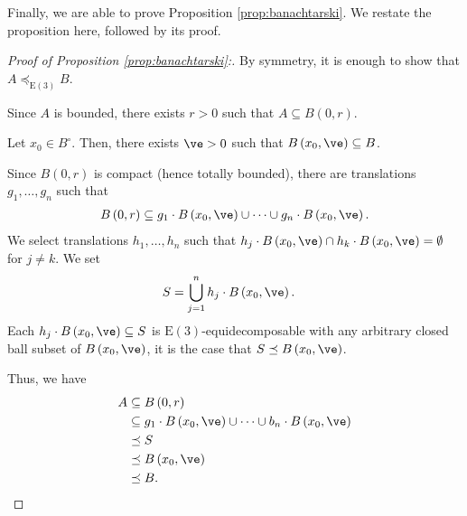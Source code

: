Finally, we are able to prove Proposition \ref{prop:banachtarski}. We restate the proposition here, followed by its proof.
\begin{tcolorbox}[blanker,breakable,left=3mm,before skip=10pt, after skip=10pt, borderline west={1pt}{0pt}{blue!50!white},sharp corners,]
\banachtarski*
\end{tcolorbox}
\begin{proof}[Proof of Proposition \ref{prop:banachtarski}:]
  By symmetry, it is enough to show that $A\preceq_{\text{E}(3)} B$.\newline

  Since $A$ is bounded, there exists $r > 0$ such that $A\subseteq B(0,r)$.\newline

  Let $x_0\in B^{\circ}$. Then, there exists $\ve > 0$ such that $B\left(x_0,\ve\right) \subseteq B$.\newline

  Since $B(0,r)$ is compact (hence totally bounded), there are translations $g_1,\dots,g_n$ such that
  \begin{align*}
    B\left(0,r\right) \subseteq g_1\cdot B\left(x_0,\ve\right) \cup \cdots \cup g_n\cdot B\left(x_0,\ve\right).
  \end{align*}
  We select translations $h_1,\dots,h_n$ such that $h_j\cdot B\left(x_0,\ve\right) \cap h_k\cdot B\left(x_0,\ve\right) = \emptyset$ for $j\neq k$. We set
  \begin{align*}
    S &= \bigcup_{j=1}^{n}h_j\cdot B\left(x_0,\ve\right).
  \end{align*}
  Each $h_j\cdot B\left(x_0,\ve\right)\subseteq S$ is $\text{E}(3)$-equidecomposable with any arbitrary closed ball subset of $B\left(x_0,\ve\right)$, it is the case that $S\preceq B\left(x_0,\ve\right)$.\newline

  Thus, we have
  \begin{align*}
    A &\subseteq B\left(0,r\right)\\
      &\subseteq g_1\cdot B\left(x_0,\ve\right)\cup\cdots\cup b_n\cdot B\left(x_0,\ve\right)\\
      &\preceq S\\
      &\preceq B\left(x_0,\ve\right)\\
      &\preceq B.
  \end{align*}
\end{proof}

